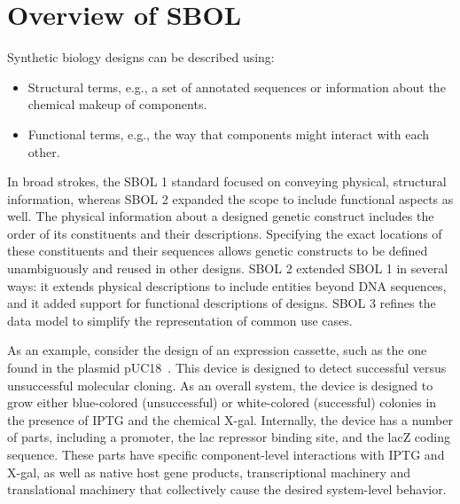 \section{Overview of SBOL}

Synthetic biology designs can be described using:
\begin{itemize}
\item Structural terms, e.g., a set of annotated sequences or information about the chemical makeup of components.
\item Functional terms, e.g., the way that components might interact with each other. 
\end{itemize}
In broad strokes, the SBOL 1 standard focused on conveying physical, structural information, whereas SBOL 2 expanded the scope to include functional aspects as well.  The physical information about a designed genetic construct includes the order of its constituents and their descriptions. Specifying the exact locations of these constituents and their sequences allows genetic constructs to be defined unambiguously and reused in other designs. SBOL 2 extended SBOL 1 in several ways: it extends physical descriptions to include entities beyond DNA sequences, and it added support for functional descriptions of designs.  SBOL 3 refines the data model to simplify the representation of common use cases.

As an example, consider the design of an expression cassette, such as the one found in the plasmid pUC18~\cite{L08752.1}. This device is designed to detect successful versus unsuccessful molecular cloning.  As an overall system, the device is designed to grow either blue-colored (unsuccessful) or white-colored (successful) colonies in the presence of IPTG and the chemical X-gal. Internally, the device has a number of parts, including a promoter, the lac repressor binding site, and the lacZ coding sequence. 
These parts have specific component-level interactions with IPTG and X-gal, as well as native host gene products, transcriptional machinery and translational machinery that collectively cause the desired system-level behavior. 

